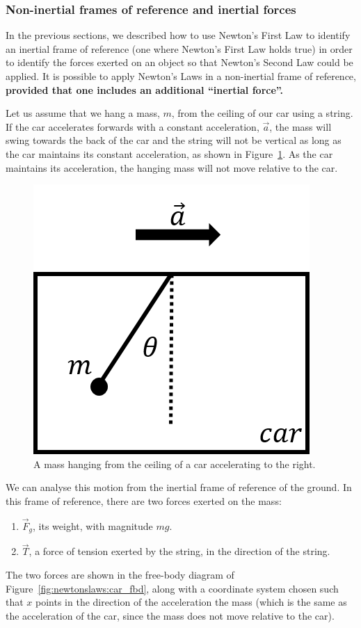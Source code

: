 \subsubsection{Non-inertial frames of reference and inertial forces}\label{sec:newtonslaws:inertialforces}

In the previous sections, we described how to use Newton's First Law to identify an inertial frame of reference (one where Newton's First Law holds true) in order to identify the forces exerted on an object so that Newton's Second Law could be applied. It is possible to apply Newton's Laws in a non-inertial frame of reference, \textbf{provided that one includes an additional ``inertial force''.}

Let us assume that we hang a mass, $m$, from the ceiling of our car using a string. If the car accelerates forwards with a constant acceleration, $\vec a$, the mass will swing towards the back of the car and the string will not be vertical as long as the car maintains its constant acceleration, as shown in Figure~\ref{fig:newtonslaws:car}. As the car maintains its acceleration, the hanging mass will not move relative to the car.

\begin{figure}[!htbp]
\centering
\includegraphics[width=0.3\linewidth]{files/car-d6de3b6fb6dc959ca9eb8cbda22e5819.png}
\caption[]{A mass hanging from the ceiling of a car accelerating to the right.}
\label{fig:newtonslaws:car}
\end{figure}

We can analyse this motion from the inertial frame of reference of the ground. In this frame of reference, there are two forces exerted on the mass:

\begin{enumerate}
\item $\vec F_g$, its weight, with magnitude $mg$.
\item $\vec T$, a force of tension exerted by the string, in the direction of the string.
\end{enumerate}

The two forces are shown in the free-body diagram of Figure~\ref{fig:newtonslaws:car_fbd}, along with a coordinate system chosen such that $x$ points in the direction of the acceleration the mass (which is the same as the acceleration of the car, since the mass does not move relative to the car).

